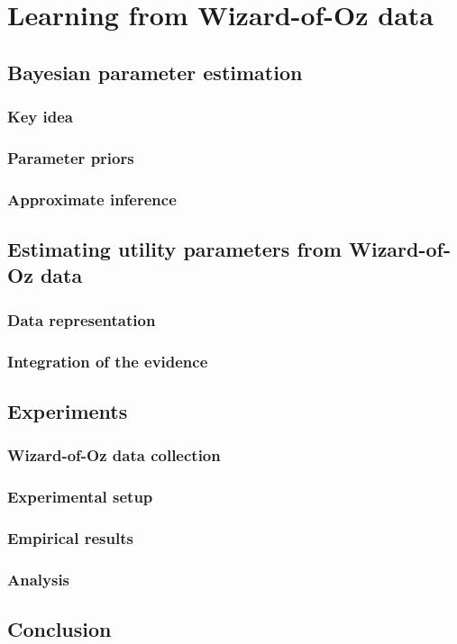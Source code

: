\chapter{Learning from Wizard-of-Oz data}
\label{chap:wozlearning}

\section{Bayesian parameter estimation}

\subsection{Key idea}

\subsection{Parameter priors}


\subsection{Approximate inference}

\section{Estimating utility parameters from Wizard-of-Oz data}

\subsection{Data representation}

\subsection{Integration of the evidence}

\section{Experiments}
\label{sec:wozlearning-experiments}

\subsection{Wizard-of-Oz data collection}

\subsection{Experimental setup}

\subsection{Empirical results}

\subsection{Analysis}

\section{Conclusion}